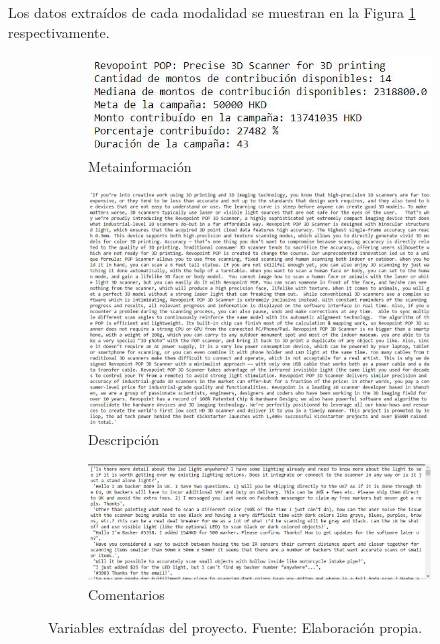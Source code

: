 Los datos extraídos de cada modalidad se muestran en la Figura \ref{5:fig15} respectivamente.
\begin{figure}[!ht]
	\centering
	\small
	\begin{subfigure}{.35\textwidth}
		\centering
		\includegraphics[width=0.95\linewidth]{5/figures/metadata_scraped_project.jpg}
		\caption{Metainformación}
	\end{subfigure}%
	\begin{subfigure}{.35\textwidth}
		\centering
		\includegraphics[width=0.95\linewidth]{5/figures/description_scraped_project.jpg}
		\caption{Descripción}
	\end{subfigure}%
	\begin{subfigure}{.35\textwidth}
		\centering
		\includegraphics[width=0.95\linewidth]{5/figures/comments_scraped_project.jpg}
		\caption{Comentarios}
	\end{subfigure}
	\caption{Variables extraídas del proyecto. Fuente: Elaboración propia.}
	\label{5:fig15}
\end{figure}

